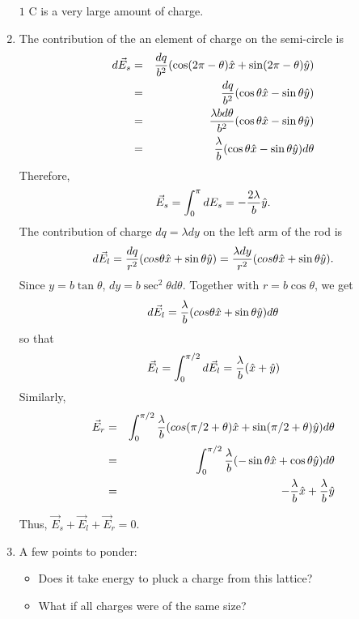 \documentclass{article}
\begin{document}
\begin{enumerate}
$1$ C is a very large amount of charge.

\item The contribution of the an element of charge on the semi-circle is
\begin{eqnarray*}
d\vec{E}_s &=& \frac{dq}{b^2}(\cos(2\pi - \theta)\hat{x} + \sin(2\pi - \theta)\hat{y}) \\
 &=& \frac{dq}{b^2}(\cos\theta\hat{x} - \sin\theta\hat{y}) \\
 &=& \frac{\lambda bd\theta}{b^2}(\cos\theta\hat{x} - \sin\theta\hat{y}) \\
 &=& \frac{\lambda}{b}(\cos\theta\hat{x} - \sin\theta\hat{y})d\theta
\end{eqnarray*}
Therefore,
\[
\vec{E}_s = \int_0^\pi dE_s = -\frac{2\lambda}{b}\hat{y}.
\]
The contribution of charge $dq = \lambda dy$ on the left arm of the rod is
\[
d\vec{E}_l = \frac{dq}{r^2}(cos\theta\hat{x} + \sin\theta\hat{y}) 
= \frac{\lambda dy}{r^2}(cos\theta\hat{x} + \sin\theta\hat{y}).
\]
Since $y = b\tan\theta$, $dy = b\sec^2\theta d\theta$. Together with $r=b\cos\theta$,
we get
\[
d\vec{E}_l = \frac{\lambda}{b}(cos\theta\hat{x} + \sin\theta\hat{y})d\theta
\]
so that
\[
\vec{E}_l = \int_0^{\pi/2}d\vec{E}_l = \frac{\lambda}{b}(\hat{x} + \hat{y})
\]
Similarly,
\begin{eqnarray*}
\vec{E}_r &=& \int_{0}^{\pi/2} \frac{\lambda}{b}(cos(\pi/2 + \theta)\hat{x} + \sin(\pi/2 +\theta)\hat{y})d\theta \\
 &=& \int_{0}^{\pi/2} \frac{\lambda}{b}(-\sin\theta\hat{x} + \cos\theta\hat{y})d\theta \\
 &=& -\frac{\lambda}{b}\hat{x} + \frac{\lambda}{b}\hat{y}
\end{eqnarray*}

Thus, $\vec{E}_s + \vec{E}_l + \vec{E}_r = 0$.


\item 
A few points to ponder:
\begin{itemize}
\item Does it take energy to pluck a charge from this lattice?
\item What if all charges were of the same size?
\end{itemize}


\end{enumerate}
\end{document}
